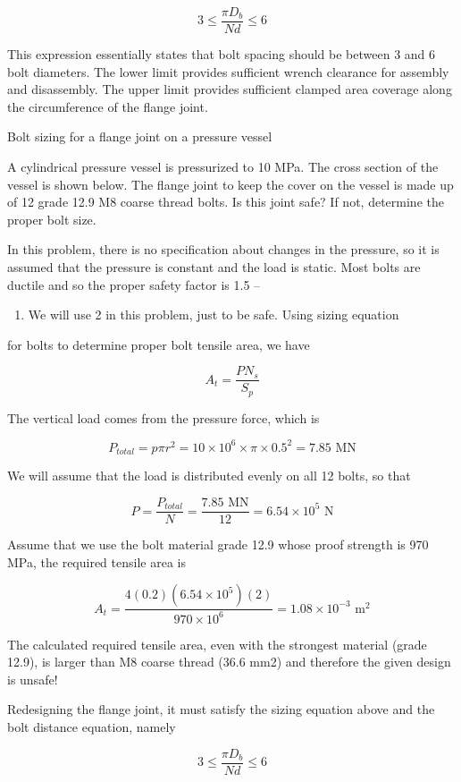 \documentclass[a4paper,openany,nobib]{tufte-book}
\begin{document}
{{$$3 \leqslant \frac{\pi D_b}{Nd} \leqslant 6$$

This expression essentially states that bolt spacing should be between 3
and 6 bolt diameters. The lower limit provides sufficient wrench
clearance for assembly and disassembly. The upper limit provides
sufficient clamped area coverage along the circumference of the flange
joint.

Bolt sizing for a flange joint on a pressure vessel

A cylindrical pressure vessel is pressurized to 10 MPa. The cross
section of the vessel is shown below. The flange joint to keep the cover
on the vessel is made up of 12 grade 12.9 M8 coarse thread bolts. Is
this joint safe? If not, determine the proper bolt size.


In this problem, there is no specification about changes in the
pressure, so it is assumed that the pressure is constant and the load is
static. Most bolts are ductile and so the proper safety factor is 1.5 --
\begin{enumerate}
\item We will use 2 in this problem, just to be safe. Using sizing equation
\end{enumerate}
for bolts to determine proper bolt tensile area, we have

$$A_t = \frac{PN_s}{S_p}$$

The vertical load comes from the pressure force, which is

$$P_{total} = p\pi r^2 = 10 \times 10^6 \times \pi  \times 0.5^2 = 7.85\text{ MN}$$

We will assume that the load is distributed evenly on all 12 bolts, so
that

$$P = \frac{P_{total}}{N} = \frac{7.85 \text{ MN}}{12} = 6.54 \times
  {10^5}\text{ N}$$

Assume that we use the bolt material grade 12.9 whose proof strength is
970 MPa, the required tensile area is

$$A_t = \frac{4(0.2)(6.54 \times 10^5)(2)}{970 \times 10^6} = 1.08 \times 10^{-3} \text{ m}^2$$

The calculated required tensile area, even with the strongest material
(grade 12.9), is larger than M8 coarse thread (36.6 mm2) and therefore
the given design is unsafe!

Redesigning the flange joint, it must satisfy the sizing equation above
and the bolt distance equation, namely

$$3 \leqslant \frac{\pi D_b}{Nd} \leqslant 6$$

}}
\end{document}
